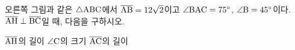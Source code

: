 \noindent\begin{minipage}[t]{0.58\linewidth}\vspace{0pt}\raggedright 오른쪽 그림과 같은 $\triangle\mathrm{ABC}$에서 $\overline{\mathrm{AB}}=12\sqrt{2}$이고 $\angle\mathrm{BAC}=75^\circ$, $\angle\mathrm{B}=45^\circ$이다. $\overline{\mathrm{AH}}\perp\overline{\mathrm{BC}}$일 때, 다음을 구하시오.\end{minipage}\hfill\begin{minipage}[t]{0.4\linewidth}\vspace{0pt}\centering \resizebox{\ifdim\width>\linewidth\linewidth\else\width\fi}{!}{}\end{minipage}\par
{} $\overline{\mathrm{AH}}$의 길이
 $\angle\mathrm{C}$의 크기
 $\overline{\mathrm{AC}}$의 길이
